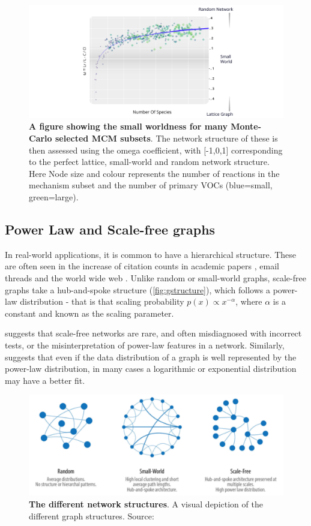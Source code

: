 \begin{figure}[H]
     \centering
         \includegraphics[width=\textwidth]{figures_c3/logpart.pdf}
        \caption{\textbf{A figure showing the small worldness for many Monte-Carlo selected MCM subsets}. The network structure of these is then assessed using the omega coefficient, with [-1,0,1] corresponding to the perfect lattice, small-world and random network structure. Here Node size and colour represents the number of reactions in the mechanism subset and the number of primary VOCs (blue=small, green=large).}
        \label{fig:smw}
\end{figure}



\subsection{Power Law and Scale-free graphs}
In real-world applications, it is common to have a hierarchical structure. These are often seen in the increase of citation counts in academic papers \citep{scalefreepapers}, email threads \citep{scalefreeemail} and the world wide web \citep{neoj4}. Unlike random or small-world graphs, scale-free graphs take a hub-and-spoke structure (\autoref{fig:gstructure}), which follows a power-law distribution - that is that scaling probability $p(x) \propto x^{-\alpha}$, where $\alpha$ is a constant and known as the scaling parameter.

\cite{scalefreebad} suggests that scale-free networks are rare, and often misdiagnosed with incorrect tests, or the misinterpretation of power-law features in a network. Similarly, \cite{plexp} suggests that even if the data distribution of a graph is well represented by the power-law distribution, in many cases a logarithmic or exponential distribution may have a better fit. 

\begin{figure}[H]
     \centering
         \includegraphics[width=.8\textwidth]{figures_c3/graphstyles.png}
        \caption{\textbf{The different network structures}. A visual depiction of the different graph structures. Source: \cite{neoj4}}
        \label{fig:gstructure}
\end{figure}

